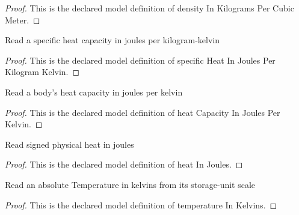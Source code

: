 \begin{proof}
  This is the declared model definition of density In Kilograms Per Cubic Meter.
\end{proof}
\begin{definition}
  \label{def:physics:phyx-mini-0455:phyxminiproblems-problemphyxmini0455-specificheatinjoulesperkilogramkelvin}
  Read a specific heat capacity in joules per kilogram-kelvin
\end{definition}
\begin{proof}
  This is the declared model definition of specific Heat In Joules Per Kilogram Kelvin.
\end{proof}
\begin{definition}
  \label{def:physics:phyx-mini-0455:phyxminiproblems-problemphyxmini0455-heatcapacityinjoulesperkelvin}
  Read a body's heat capacity in joules per kelvin
\end{definition}
\begin{proof}
  This is the declared model definition of heat Capacity In Joules Per Kelvin.
\end{proof}
\begin{definition}
  \label{def:physics:phyx-mini-0455:phyxminiproblems-problemphyxmini0455-heatinjoules}
  Read signed physical heat in joules
\end{definition}
\begin{proof}
  This is the declared model definition of heat In Joules.
\end{proof}
\begin{definition}
  \label{def:physics:phyx-mini-0455:phyxminiproblems-problemphyxmini0455-temperatureinkelvins}
  Read an absolute Temperature in kelvins from its storage-unit scale
\end{definition}
\begin{proof}
  This is the declared model definition of temperature In Kelvins.
\end{proof}
